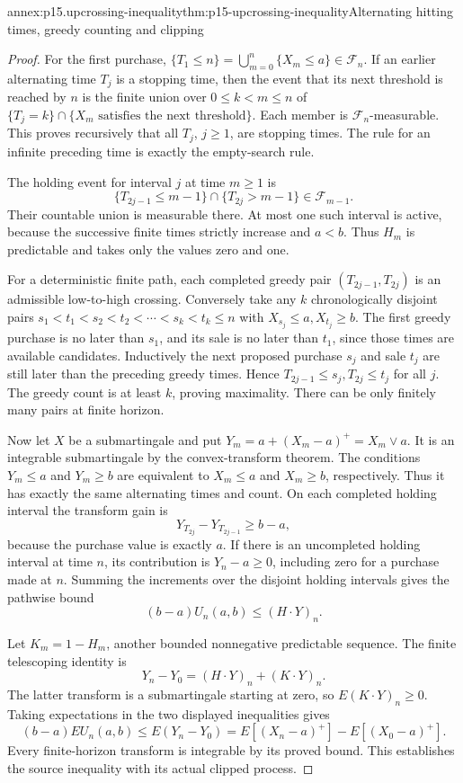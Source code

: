 \begin{annexitem}{annex:p15.upcrossing-inequality}{thm:p15-upcrossing-inequality}{Alternating hitting times, greedy counting and clipping}
\begin{proof}
For the first purchase,
\(\{T_1\leq n\}=\bigcup_{m=0}^n\{X_m\leq a\}\in\mathcal F_n\).
If an earlier alternating time \(T_j\) is a stopping time, then
the event that its next threshold is reached by \(n\) is the
finite union over \(0\leq k<m\leq n\) of
\(\{T_j=k\}\cap\{X_m\text{ satisfies the next threshold}\}\).
Each member is \(\mathcal F_n\)-measurable.
This proves recursively that all \(T_j\), \(j\geq1\), are stopping times.
The rule for an infinite preceding time is exactly the empty-search rule.

The holding event for interval \(j\) at time \(m\geq1\) is
\[
       \{T_{2j-1}\leq m-1\}\cap\{T_{2j}>m-1\}\in\mathcal F_{m-1}.
\]
Their countable union is measurable there.
At most one such interval is active, because the successive finite
times strictly increase and \(a<b\).
Thus \(H_m\) is predictable and takes only the values zero and one.

For a deterministic finite path, each completed greedy pair
\((T_{2j-1},T_{2j})\) is an admissible low-to-high crossing.
Conversely take any \(k\) chronologically disjoint pairs
\(s_1<t_1<s_2<t_2<\cdots<s_k<t_k\leq n\)
with \(X_{s_j}\leq a,X_{t_j}\geq b\).
The first greedy purchase is no later than \(s_1\), and its sale
is no later than \(t_1\), since those times are available candidates.
Inductively the next proposed purchase \(s_j\) and sale \(t_j\)
are still later than the preceding greedy times.
Hence \(T_{2j-1}\leq s_j,T_{2j}\leq t_j\) for all \(j\).
The greedy count is at least \(k\), proving maximality.
There can be only finitely many pairs at finite horizon.

Now let \(X\) be a submartingale and put
\(Y_m=a+(X_m-a)^+=X_m\vee a\).
It is an integrable submartingale by the convex-transform theorem.
The conditions \(Y_m\leq a\) and \(Y_m\geq b\) are equivalent
to \(X_m\leq a\) and \(X_m\geq b\), respectively.
Thus it has exactly the same alternating times and count.
On each completed holding interval the transform gain is
\[
                    Y_{T_{2j}}-Y_{T_{2j-1}}\geq b-a,
\]
because the purchase value is exactly \(a\).
If there is an uncompleted holding interval at time \(n\),
its contribution is \(Y_n-a\geq0\), including zero for a purchase
made at \(n\). Summing the increments over the disjoint holding
intervals gives the pathwise bound
\[
                              (b-a)U_n(a,b)\leq(H\cdot Y)_n.
\]

Let \(K_m=1-H_m\), another bounded nonnegative predictable sequence.
The finite telescoping identity is
\[
                         Y_n-Y_0=(H\cdot Y)_n+(K\cdot Y)_n.
\]
The latter transform is a submartingale starting at zero, so
\(E(K\cdot Y)_n\geq0\).
Taking expectations in the two displayed inequalities gives
\[
 (b-a)EU_n(a,b)\leq E(Y_n-Y_0)
                  =E[(X_n-a)^+]-E[(X_0-a)^+].
\]
Every finite-horizon transform is integrable by its proved bound.
This establishes the source inequality with its actual clipped process.
\end{proof}
\end{annexitem}


